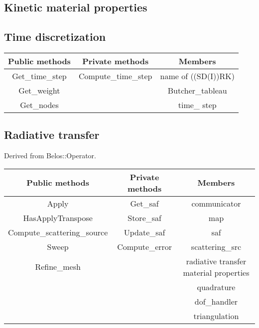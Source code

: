 \subsection{Kinetic material properties}

\subsection{Time discretization}
\begin{table}[H]
  \centering
  \begin{tabular}{|c|c|c|}
    \hline
    Public methods & Private methods & Members \\
    \hline
    Get\_time\_step & Compute\_time\_step & name of ((SD(I))RK) \\
    Get\_weight     &                     & Butcher\_tableau    \\
    Get\_nodes      &                     & time\_ step         \\
    \hline
  \end{tabular}
\end{table}  

\subsection{Radiative transfer}
Derived from Belos::Operator. 
\begin{table}[H]
  \centering
  \begin{tabular}{|c|c|c|}
    \hline
    Public methods & Private methods & Members \\
    \hline
    Apply                       & Get\_saf   & communicator \\
    HasApplyTranspose           & Store\_saf & map\\
    Compute\_scattering\_source & Update\_saf & saf \\
    Sweep                       & Compute\_error & scattering\_src \\
    Refine\_mesh                & & radiative transfer material properties \\
                                & & quadrature \\
                                & & dof\_handler \\
                                & & triangulation \\
    \hline
  \end{tabular}
\end{table}

